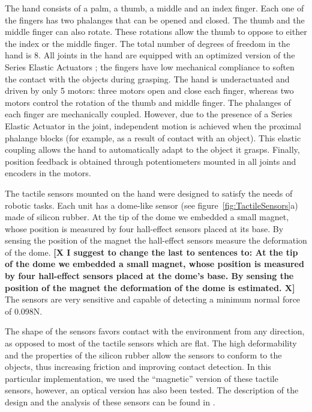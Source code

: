 The hand consists of a palm, a thumb, a middle and an index
finger. Each one of the fingers has two phalanges that can be
opened and closed. The thumb and the middle finger can also
rotate. These rotations allow the thumb to oppose to either the
index or the middle finger. The total number of degrees of freedom
in the hand is 8. All joints in the hand are equipped with an
optimized version of the Series Elastic Actuators \cite{actuator};
the fingers have low mechanical compliance to soften the contact
with the objects during grasping.
The hand is underactuated and driven by only 5 motors:
three motors open and close each finger, whereas two motors
control the rotation of the thumb and middle finger. The
phalanges of each finger are mechanically coupled. However, due to the
presence of a Series Elastic Actuator in the joint, independent
motion is achieved when the proximal phalange blocks (for example,
as a result of contact with an object). This elastic coupling
allows the hand to automatically adapt to the object it grasps.
Finally, position feedback is obtained through potentiometers
mounted in all joints and encoders in the motors.

The tactile sensors mounted on the hand were designed to satisfy the
needs of robotic tasks. %
Each unit has a dome-like sensor (see
figure~\ref{fig:TactileSensors}a) made of silicon rubber. At the
tip of the dome we embedded a small magnet, whose position is
measured by four hall-effect sensors placed at its base. By
sensing the position of the magnet the hall-effect sensors measure
the deformation of the dome. \textbf{[X I suggest to change the
last to sentences to: At the tip of the dome we embedded a small
magnet, whose position is measured by four hall-effect sensors
placed at the dome's base. By sensing the position of the magnet
the deformation of the dome is estimated. X]} The sensors are very
sensitive and capable of detecting a minimum normal force of
0.098N.

The shape of the sensors favors contact with the environment from
any direction, as opposed to most of the tactile sensors which are
flat. The high deformability and the properties of the silicon
rubber allow the sensors to conform to the objects, thus
increasing friction and improving contact detection. In this
particular implementation, we used the ``magnetic'' version of
these tactile sensors, however, an optical version has also been
tested. The description of the design and the analysis of these
sensors can be found in \cite{etorresjSoft}.

